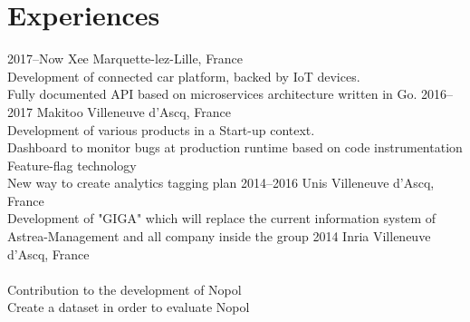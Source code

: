 \documentclass[hidelinks]{cv-style}          %
\begin{document}
\section{Experiences}
\begin{entrylist}
\entry
  {2017--Now}
  {Xee}
  {Marquette-lez-Lille, France}
  {\\
  Development of connected car platform, backed by IoT devices.\\
  Fully documented API based on microservices architecture written in Go.
}
\entry
  {2016--2017}
  {Makitoo}
  {Villeneuve d'Ascq, France}
  {\\
  Development of various products in a Start-up context.\\
  Dashboard to monitor bugs at production runtime based on code instrumentation\\
  Feature-flag technology\\
  New way to create analytics tagging plan
}
\entry
  {2014--2016}
  {Unis}
  {Villeneuve d'Ascq, France}
  {\\
  Development of "GIGA" which will replace the current information system of Astrea-Management and all company inside the group
}
\entry
  {2014}
  {Inria}
  {Villeneuve d'Ascq, France}
  {\\
  \\
  Contribution to the development of Nopol\\
  Create a dataset in order to evaluate Nopol
}


\end{entrylist}
\leavevmode\newline

\end{document}
